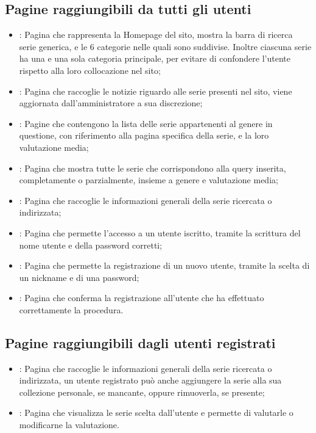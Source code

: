\documentclass{tecweb}
\begin{document}
	\subsection{Pagine raggiungibili da tutti gli utenti}
	\begin{itemize}
		\item {}: Pagina che rappresenta la Homepage del sito, mostra la barra di ricerca serie generica, e le 6 categorie nelle quali sono suddivise. %
		Inoltre ciascuna serie ha una e una sola categoria principale, per evitare di confondere l'utente rispetto alla loro collocazione nel sito;
		\item {}: Pagina che raccoglie le notizie riguardo alle serie presenti nel sito, viene aggiornata dall'amministratore a sua discrezione;
		\item {}: Pagine che contengono la lista delle serie appartenenti al genere in questione, con riferimento alla pagina specifica della serie, e la loro valutazione media;
		\item {}: Pagina che mostra tutte le serie che corrispondono alla query inserita, completamente o parzialmente, insieme a genere e valutazione media;
		\item {}: Pagina che raccoglie le informazioni generali della serie ricercata o indirizzata;
		\item {}: Pagina che permette l'accesso a un utente iscritto, tramite la scrittura del nome utente e della password corretti;
		\item {}: Pagina che permette la registrazione di un nuovo utente, tramite la scelta di un nickname e di una password;
		\item {}: Pagina che conferma la registrazione all'utente che ha effettuato correttamente la procedura.
	\end{itemize}
	\subsection{Pagine raggiungibili dagli utenti registrati}
	\begin{itemize}
		\item {}: Pagina che raccoglie le informazioni generali della serie ricercata o indirizzata, un utente registrato può anche aggiungere la serie alla sua collezione personale, se mancante, oppure rimuoverla, se presente;
		\item {}: Pagina che visualizza le serie scelta dall'utente e permette di valutarle o modificarne la valutazione.
	\end{itemize}
\end{document}
